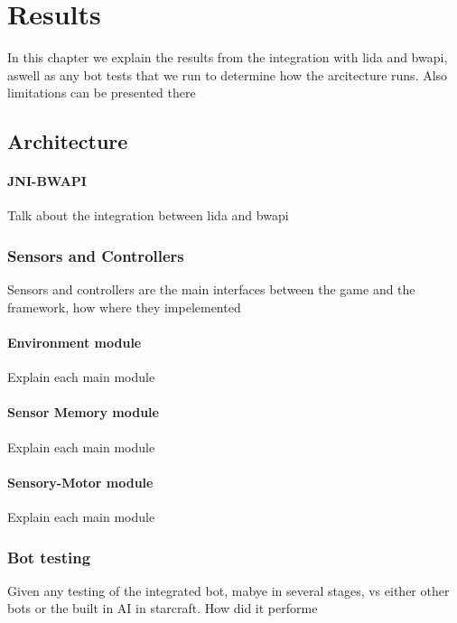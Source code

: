 
\chapter{Results}
In this chapter we explain the results from the integration with lida and bwapi, aswell as any bot tests that we run to determine how the arcitecture runs. Also limitations can be presented there
\section{Architecture}
\label{sec:architecture}

\subsubsection{JNI-BWAPI}
Talk about the integration between lida and bwapi
\subsection{Sensors and Controllers}
Sensors and controllers are the main interfaces between the game and the framework, how where they impelemented
\subsubsection{Environment module}
Explain each main module
\subsubsection{Sensor Memory module}
Explain each main module
\subsubsection{Sensory-Motor module}
Explain each main module

\subsection{Bot testing}
Given any testing of the integrated bot, mabye in several stages, vs either other bots or the built in AI in starcraft. How did it performe
